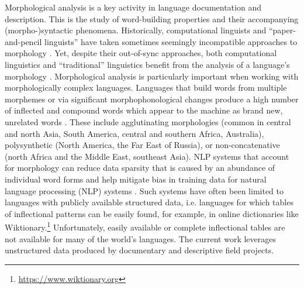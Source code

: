 Morphological analysis is a key activity in language documentation and description. This is the study of word-building properties and their accompanying (morpho-)syntactic phenomena. Historically, computational linguists and ``paper-and-pencil linguists'' have taken sometimes seemingly incompatible approaches to morphology \citep{sproat_1992,karttunen_2005}. Yet, despite their out-of-sync approaches, both computational linguistics and ``traditional'' linguistics benefit from the analysis of a language's morphology \citep{cotterell_labeled_2015}. Morphological analysis is particularly important when working with morphologically complex languages.  Languages that build words from multiple morphemes or via significant morphophonological changes produce a high number of inflected and compound words which appear to the machine as brand new, unrelated words \citep{dreyer_discovering_2011,goldsmith_computational_2017,hammarstrom_unsupervised_2011,kann_neural_2016,ruokolainen_supervised_2013}. These include agglutinating morphologies (common in central and north Asia, South America, central and southern Africa, Australia), polysynthetic (North America, the Far East of Russia), or non-concatenative (north Africa and the Middle East, southeast Asia). NLP systems that account for morphology can reduce data sparsity that is caused by an abundance of individual word forms \citep{mccarthy-etal-2019-sigmorphon,vylomova2020sigmorphon} and help mitigate bias in training data for natural language processing (NLP) systems \citep{zmigrod-etal-2019-counterfactual}. Such systems have often been limited to languages with publicly available structured data, i.e. languages for which tables of inflectional patterns can be easily found, for example, in online dictionaries like Wiktionary.\footnote{\url{https://www.wiktionary.org}} Unfortunately, easily available or complete inflectional tables are not available for many of the world's languages. The current work leverages unstructured data produced by documentary and descriptive field projects.
%

